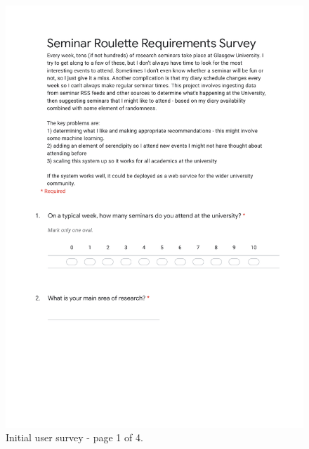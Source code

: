 \documentclass{l4proj}
\begin{document}
\begin{appendices}
\begin{figure}[htb]
    \centering
    \includegraphics[width=\linewidth]{images/initial_user_survey_1.pdf}    
    \caption{Initial user survey - page 1 of 4.}
    \label{fig:initial_user_survey_1} 
\end{figure}


\end{appendices}
\end{document}
